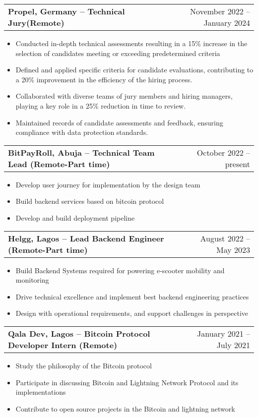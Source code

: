\documentclass[a4paper,12pt]{article}
\makeatletter
\newenvironment{joblong}[2]
    {
    \begin{tabularx}{\linewidth}{@{}l X r@{}}
    \textbf{#1} & \hfill &  #2 \\[3.75pt]
    \end{tabularx}
    \begin{minipage}[t]{\linewidth}
    \begin{itemize}[nosep,after=\strut, leftmargin=1em, itemsep=3pt,label=--]
    }
    {
    \end{itemize}
    \end{minipage}    
    }
\makeatother
\begin{document}
\begin{joblong}{Propel, Germany -- Technical Jury(Remote)}{November 2022 -- January 2024}
\item Conducted in-depth technical assessments resulting in a 15\% increase in the selection of candidates meeting or exceeding predetermined criteria
\item Defined and applied specific criteria for candidate evaluations, contributing to a 20\% improvement in the efficiency of the hiring process. 
\item Collaborated with diverse teams of jury members and hiring managers, playing a key role in a 25\% reduction in time to review.
\item Maintained records of candidate assessments and feedback, ensuring compliance with data protection standards.
\end{joblong}

\begin{joblong}{BitPayRoll, Abuja -- Technical Team Lead (Remote-Part time)}{October 2022 -- present}
\item Develop user journey for implementation by the design team
\item Build backend services based on bitcoin protocol
\item Develop and build deployment pipeline
\end{joblong}

\begin{joblong}{Helgg, Lagos -- Lead Backend Engineer (Remote-Part time)}{August 2022 -- May 2023}
\item Build Backend Systems required for powering e-scooter mobility and monitoring
\item Drive technical excellence and implement best backend engineering practices
\item Design with operational requirements, and support challenges in perspective
\end{joblong}

\begin{joblong}{Qala Dev, Lagos -- Bitcoin Protocol Developer Intern (Remote)}{January 2021 -- July 2021}
\item Study the philosophy of the Bitcoin protocol
\item Participate in discussing Bitcoin and Lightning Network Protocol and its implementations
\item Contribute to open source projects in the Bitcoin and lightning network
\end{joblong}
\end{document}
